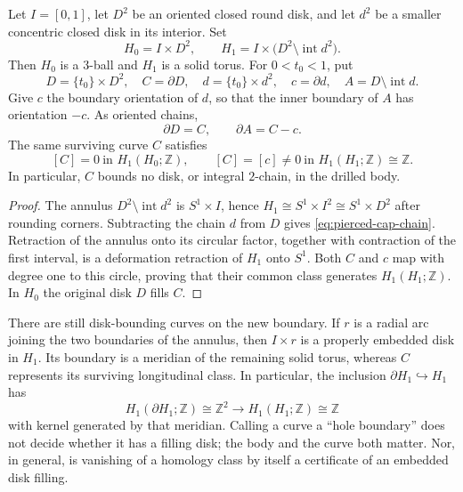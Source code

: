 \begin{proposition}
\label{prop:pierced-cap-annulus}
Let $I=[0,1]$, let $D^2$ be an oriented closed round disk, and let $d^2$ be a
smaller concentric closed disk in its interior.  Set
\[
 H_0=I\times D^2,\qquad
 H_1=I\times\bigl(D^2\setminus\operatorname{int}d^2\bigr).
\]
Then $H_0$ is a $3$-ball and $H_1$ is a solid torus.  For $0<t_0<1$, put
\[
 D=\{t_0\}\times D^2,\quad C=\partial D,\quad
 d=\{t_0\}\times d^2,\quad c=\partial d,\quad
 A=D\setminus\operatorname{int}d.
\]
Give $c$ the boundary orientation of $d$, so that the inner boundary of $A$
has orientation $-c$.  As oriented chains,
\begin{equation}\label{eq:pierced-cap-chain}
 \partial D=C,\qquad \partial A=C-c.
\end{equation}
The same surviving curve $C$ satisfies
\[
 [C]=0\ \text{in }H_1(H_0;\mathbb Z),\qquad
 [C]=[c]\ne0\ \text{in }H_1(H_1;\mathbb Z)\cong\mathbb Z.
\]
In particular, $C$ bounds no disk, or integral $2$-chain, in the drilled body.
\end{proposition}

\begin{proof}
The annulus $D^2\setminus\operatorname{int}d^2$ is $S^1\times I$, hence
$H_1\cong S^1\times I^2\cong S^1\times D^2$ after rounding corners.
Subtracting the chain $d$ from $D$ gives
\eqref{eq:pierced-cap-chain}.  Retraction of the annulus onto its circular
factor, together with contraction of the first interval, is a deformation
retraction of $H_1$ onto $S^1$.  Both $C$ and $c$ map with degree one to this
circle, proving that their common class generates $H_1(H_1;\mathbb Z)$.
In $H_0$ the original disk $D$ fills $C$.
\end{proof}

\begin{remark}
\label{rem:drilled-body-meridian}
There are still disk-bounding curves on the new boundary.  If $r$ is a radial
arc joining the two boundaries of the annulus, then $I\times r$ is a properly
embedded disk in $H_1$.  Its boundary is a meridian of the remaining solid
torus, whereas $C$ represents its surviving longitudinal class.  In particular,
the inclusion $\partial H_1\hookrightarrow H_1$ has
\[
 H_1(\partial H_1;\mathbb Z)\cong\mathbb Z^2
 \longrightarrow H_1(H_1;\mathbb Z)\cong\mathbb Z
\]
with kernel generated by that meridian.  Calling a curve a ``hole boundary''
does not decide whether it has a filling disk; the body and the curve both
matter.  Nor, in general, is vanishing of a homology class by itself a
certificate of an embedded disk filling.
\end{remark}

